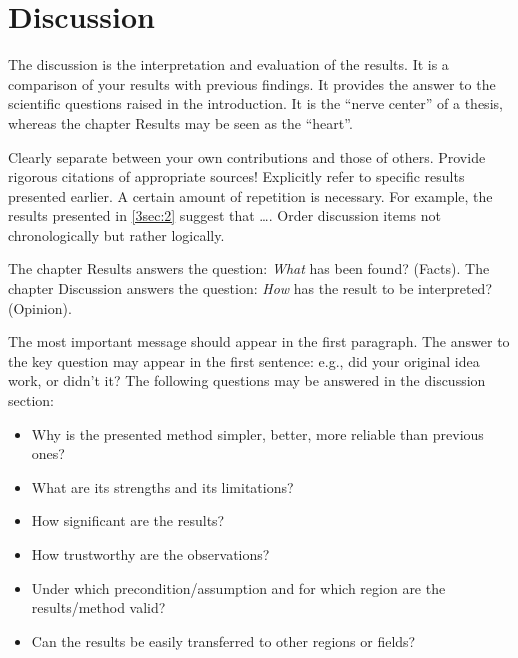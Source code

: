 \chapter{Discussion}\label{disc}
\thispagestyle{plain}

The discussion is the interpretation and evaluation of the results. It is a
comparison of your results with previous findings. It provides the answer to the
scientific questions raised in the introduction. It is the ``nerve center'' of a
thesis, whereas the chapter Results may be seen as the ``heart''.

Clearly separate between your own contributions and those of others. Provide
rigorous citations of appropriate sources! Explicitly refer to specific results
presented earlier. A certain amount of repetition is necessary. For
example, the results presented in \ref{3sec:2} suggest that \dots. Order
discussion items not chronologically but rather logically.

The chapter Results answers the question: \emph{What} has been
found? (Facts). The chapter Discussion answers the question: \emph{How} has the
result to be interpreted? (Opinion).

The most important message should appear in the first paragraph. The answer to
the key question may appear in the first sentence: e.g., did your original idea
work, or didn't it? The following questions may be answered in the discussion
section:
\begin{itemize}
\item Why is the presented method simpler, better, more reliable than previous
ones?
\item What are its strengths and its limitations?
\item How significant are the results?
\item How trustworthy are the observations?
\item Under which precondition/assumption and for which region are the
results/method valid?
\item Can the results be easily transferred to other regions or fields?
\end{itemize}
